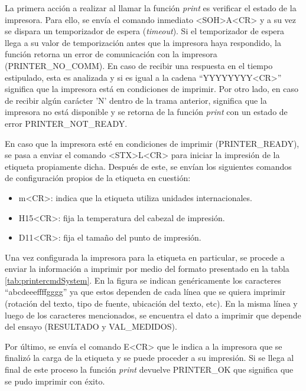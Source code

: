 La primera acción a realizar al llamar la función \textit{print} es verificar el estado de la impresora. Para ello, se envía el comando inmediato \textless{}SOH\textgreater{}A\textless{}CR\textgreater{} y a su vez se dispara un temporizador de espera (\textit{timeout}). Si el temporizador de espera llega a su valor de temporización antes que la impresora haya respondido, la función retorna un error de comunicación con la impresora (PRINTER\_NO\_COMM). En caso de recibir una  respuesta en el tiempo estipulado, esta es analizada y si es igual a la cadena ``YYYYYYYY\textless{}CR\textgreater{}'' significa que la impresora está en condiciones de imprimir. Por otro lado, en caso de recibir algún carácter 'N' dentro de la trama anterior, significa que la impresora no está disponible y se retorna de la función \textit{print} con un estado de error PRINTER\_NOT\_READY.

En caso que la impresora esté en condiciones de imprimir (PRINTER\_READY), se pasa a enviar el comando \textless{}STX\textgreater{}L\textless{}CR\textgreater{} para iniciar la impresión de la etiqueta propiamente dicha. Después de este, se envían los siguientes comandos de configuración propios de la etiqueta en cuestión:
\begin{itemize}
\item m\textless{}CR\textgreater{}: indica que la etiqueta utiliza unidades internacionales.
\item H15\textless{}CR\textgreater{}: fija la temperatura del cabezal de impresión.
\item D11\textless{}CR\textgreater{}: fija el tamaño del punto de impresión.
\end{itemize}

Una vez configurada la impresora para la etiqueta en particular, se procede a enviar la información a imprimir por medio del formato presentado en la tabla \ref{tab:printercmdSystem}. En la figura se indican genéricamente los caracteres ``abcdeeeffffgggg'' ya que estos dependen de cada línea que se quiera imprimir (rotación del texto, tipo de fuente, ubicación del texto, etc). En la misma línea y luego de los caracteres mencionados, se encuentra el dato a imprimir que depende del ensayo (RESULTADO y VAL\_MEDIDOS).

Por último, se envía el comando E\textless{}CR\textgreater{} que le indica a la impresora que se finalizó la carga de la etiqueta y se puede proceder a su impresión. Si se llega al final de este proceso la función \textit{print} devuelve PRINTER\_OK que significa que se pudo imprimir con éxito.

